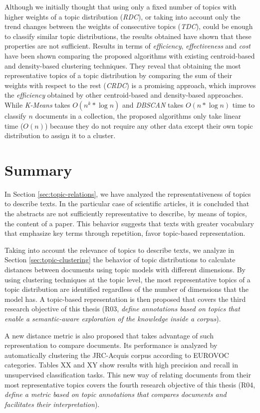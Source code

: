 Although we initially thought that using only a fixed number of topics with higher weights of a topic distribution (\textit{RDC}), or taking into account only the trend changes between the weights of consecutive topics (\textit{TDC}), could be enough to classify similar topic distributions, the results obtained have shown that these properties are not sufficient. Results in terms of \textit{efficiency}, \textit{effectiveness} and \textit{cost} have been shown comparing the proposed algorithms with existing centroid-based and density-based clustering techniques. They reveal that obtaining the most representative topics of a topic distribution  by comparing the sum of their weights with respect to the rest (\textit{CRDC}) is a promising approach, which improves the \textit{efficiency} obtained by other centroid-based and density-based approaches. While \textit{K-Means} takes $O(n^k * \log{n})$ and \textit{DBSCAN} takes $O(n * \log{n})$ time to classify $n$ documents in a collection, the proposed algorithms only take linear time ($O(n)$) because they do not require any other data except their own topic distribution to assign it to a cluster.


\section{Summary}

In Section \ref{sec:topic-relations}, we have analyzed the representativeness of topics to describe texts. In the particular case of scientific articles, it is concluded that the abstracts are not sufficiently representative to describe, by means of topics, the content of a paper. This behavior suggests that texts with greater vocabulary that emphasize key terms through repetition, favor topic-based representation.

Taking into account the relevance of topics to describe texts, we analyze in Section {\ref{sec:topic-clustering}} the behavior of topic distributions to calculate distances between documents using topic models with different dimensions. By using clustering techniques at the topic level, the most representative topics of a topic distribution are identified regardless of the number of dimensions that the model has. A topic-based representation is then proposed that covers the third research objective of this thesis (R03, \textit{define annotations based on topics that enable a semantic-aware exploration of the knowledge inside a corpus}). 

A new distance metric is also proposed that takes advantage of such representation to compare documents. Its performance is analyzed by automatically clustering the JRC-Acquis corpus according to EUROVOC categories. Tables XX and XY show results with high precision and recall in unsupervised classification tasks. This new way of relating documents from their most representative topics covers the fourth research objective of this thesis (R04, \textit{define a metric based on topic annotations that compares documents and facilitates their interpretation}). 

